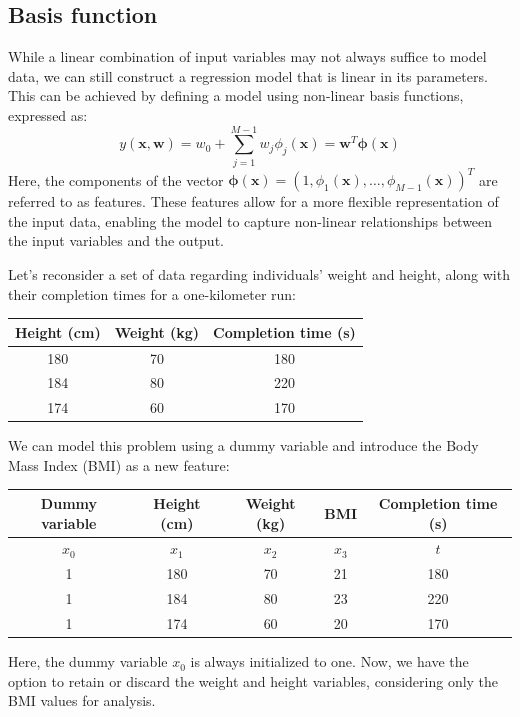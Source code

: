 \subsection{Basis function}
While a linear combination of input variables may not always suffice to model data, we can still construct a regression model that is linear in its parameters. 
This can be achieved by defining a model using non-linear basis functions, expressed as:
\[y(\textbf{x},\textbf{w})=w_0+\sum_{j=1}^{M-1}w_j \phi_j(\textbf{x})=\textbf{w}^T\boldsymbol{\phi}(\textbf{x})\]
Here, the components of the vector  $\boldsymbol{\phi}(\textbf{x})=\left( 1,\phi_1(\textbf{x}),\dots,\phi_{M-1}(\textbf{x}) \right)^T$  are referred to as features.
These features allow for a more flexible representation of the input data, enabling the model to capture non-linear relationships between the input variables and the output.
\begin{example}
    Let's reconsider a set of data regarding individuals' weight and height, along with their completion times for a one-kilometer run:
    \begin{table}[H]
        \centering
        \begin{tabular}{c|c|c}
        \textbf{Height (cm)} & \textbf{Weight (kg)} & \textbf{Completion time (s)} \\ \hline
        180                  & 70                   & 180                          \\
        184                  & 80                   & 220                          \\
        174                  & 60                   & 170                         
        \end{tabular}
    \end{table}
    We can model this problem using a dummy variable and introduce the Body Mass Index (BMI) as a new feature:
    \begin{table}[H]
        \centering
        \begin{tabular}{c|c|c|c|c}
        \textbf{Dummy variable} & \textbf{Height (cm)} & \textbf{Weight (kg)} & \textbf{BMI} & \textbf{Completion time (s)} \\ \hline
        $x_0$                   & $x_1$                & $x_2$                & $x_3$        & $t$                          \\
        1                       & 180                  & 70                   & 21           & 180                          \\
        1                       & 184                  & 80                   & 23           & 220                          \\
        1                       & 174                  & 60                   & 20           & 170                         
        \end{tabular}
    \end{table}
    Here, the dummy variable $x_0$ is always initialized to one.
    Now, we have the option to retain or discard the weight and height variables, considering only the BMI values for analysis.
\end{example}

